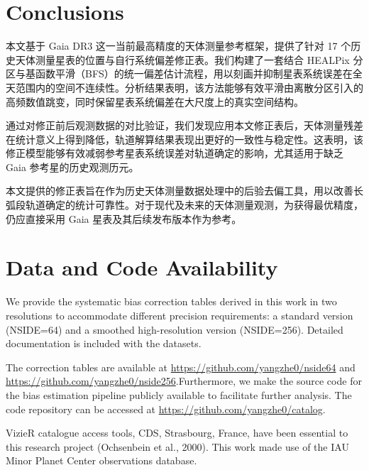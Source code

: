 \documentclass{aastex701}
\begin{document}
\section{Conclusions} \label{sec:conclusions}

本文基于 Gaia DR3 这一当前最高精度的天体测量参考框架，提供了针对 17 个历史天体测量星表的位置与自行系统偏差修正表。我们构建了一套结合 HEALPix 分区与基函数平滑（BFS）的统一偏差估计流程，用以刻画并抑制星表系统误差在全天范围内的空间不连续性。分析结果表明，该方法能够有效平滑由离散分区引入的高频数值跳变，同时保留星表系统偏差在大尺度上的真实空间结构。

通过对修正前后观测数据的对比验证，我们发现应用本文修正表后，天体测量残差在统计意义上得到降低，轨道解算结果表现出更好的一致性与稳定性。这表明，该修正模型能够有效减弱参考星表系统误差对轨道确定的影响，尤其适用于缺乏 Gaia 参考星的历史观测历元。

本文提供的修正表旨在作为历史天体测量数据处理中的后验去偏工具，用以改善长弧段轨道确定的统计可靠性。对于现代及未来的天体测量观测，为获得最优精度，仍应直接采用 Gaia 星表及其后续发布版本作为参考。

\section{Data and Code Availability} \label{sec:data}

We provide the systematic bias correction tables derived in this work in two resolutions to accommodate different precision requirements: a standard version (NSIDE=64) and a smoothed high-resolution version (NSIDE=256). Detailed documentation is included with the datasets.

The correction tables are available at \url{https://github.com/yangzhe0/nside64} and \url{https://github.com/yangzhe0/nside256}.Furthermore, we make the source code for the bias estimation pipeline publicly available to facilitate further analysis. The code repository can be accessed at \url{https://github.com/yangzhe0/catalog}.


\begin{acknowledgments}
    VizieR catalogue access tools, CDS, Strasbourg, France, have been essential to this research project (Ochsenbein et al., 2000). This work made use of the IAU Minor Planet Center observations database.
\end{acknowledgments}

\end{document}
